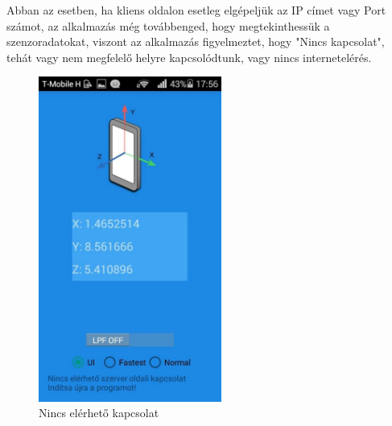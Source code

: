 \documentclass{thesis-ekf}
\theoremstyle{definition}
\theoremstyle{remark}
\begin{document}
\par Abban az esetben, ha kliens oldalon esetleg elgépeljük az IP címet vagy Port számot, az alkalmazás még továbbenged, hogy megtekinthessük a szenzoradatokat, viszont az alkalmazás figyelmeztet, hogy "Nincs kapcsolat", tehát vagy nem megfelelő helyre kapcsolódtunk, vagy nincs internetelérés. 
\begin{figure}[!h]
	\centering
	\includegraphics[width=6cm]{nincskapcsolat}
	\caption{Nincs elérhető kapcsolat}\label{nincskapcsolat}
\end{figure}
\end{document}
